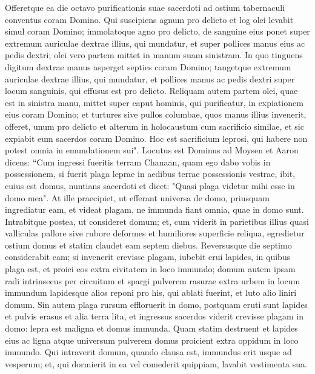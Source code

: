 \begin{biblechapter}
\verse Offeretque ea die octavo purificationis suae sacerdoti ad ostium tabernaculi conventus coram Domino.  
\verse Qui suscipiens agnum pro delicto et log olei levabit simul coram Domino;  
\verse immolatoque agno pro delicto, de sanguine eius ponet super extremum auriculae dextrae illius, qui mundatur, et super pollices manus eius ac pedis dextri;  
\verse olei vero partem mittet in manum suam sinistram. 
\verse In quo tinguens digitum dextrae manus asperget septies coram Domino; 
\verse tangetque extremum auriculae dextrae illius, qui mundatur, et pollices manus ac pedis dextri super locum sanguinis, qui effusus est pro delicto. 
\verse Reliquam autem partem olei, quae est in sinistra manu, mittet super caput hominis, qui purificatur, in expiationem eius coram Domino; 
\verse et turtures sive pullos columbae, quos manus illius invenerit, offeret, 
\verse unum pro delicto et alterum in holocaustum cum sacrificio similae, et sic expiabit eum sacerdos coram Domino. 
\verse Hoc est sacrificium leprosi, qui habere non potest omnia in emundationem sui". 
\verse Locutus est Dominus ad Moysen et Aaron dicens: 
\verse “Cum ingressi fueritis terram Chanaan, quam ego dabo vobis in possessionem, si fuerit plaga leprae in aedibus terrae possessionis vestrae, 
\verse ibit, cuius est domus, nuntians sacerdoti et dicet: "Quasi plaga videtur mihi esse in domo mea". 
\verse At ille praecipiet, ut efferant universa de domo, priusquam ingrediatur eam, et videat plagam, ne immunda fiant omnia, quae in domo sunt. Intrabitque postea, ut consideret domum; 
\verse et, cum viderit in parietibus illius quasi valliculas pallore sive rubore deformes et humiliores superficie reliqua, 
\verse egredietur ostium domus et statim claudet eam septem diebus. 
\verse Reversusque die septimo considerabit eam; si invenerit crevisse plagam, 
\verse iubebit erui lapides, in quibus plaga est, et proici eos extra civitatem in loco immundo; 
\verse domum autem ipsam radi intrinsecus per circuitum et spargi pulverem rasurae extra urbem in locum immundum 
\verse lapidesque alios reponi pro his, qui ablati fuerint, et luto alio liniri domum. 
\verse Sin autem plaga rursum effloruerit in domo, postquam eruti sunt lapides et pulvis erasus et alia terra lita, 
\verse et ingressus sacerdos viderit crevisse plagam in domo: lepra est maligna et domus immunda. 
\verse Quam statim destruent et lapides eius ac ligna atque universum pulverem domus proicient extra oppidum in loco immundo. 
\verse Qui intraverit domum, quando clausa est, immundus erit usque ad vesperum; 
\verse et, qui dormierit in ea vel comederit quippiam, lavabit vestimenta sua. 

\end{biblechapter}
